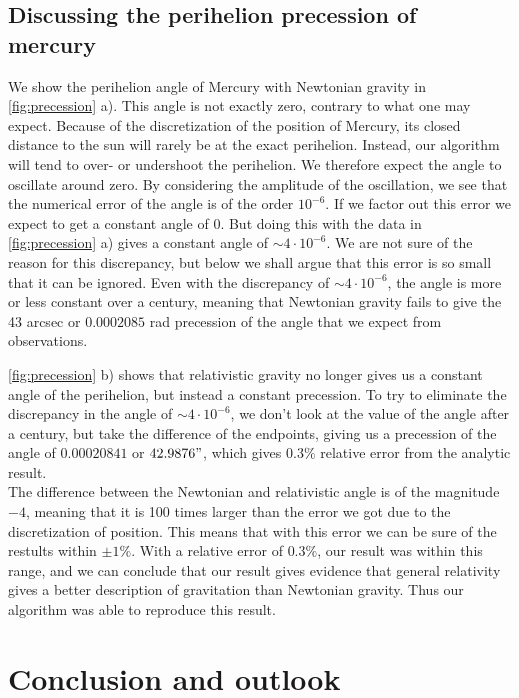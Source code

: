 \documentclass[a4paper, 10pt]{article}
\begin{document}
\subsection{Discussing the perihelion precession of mercury}
We show the perihelion angle of Mercury with Newtonian gravity in \cref{fig:precession} a). This angle is not exactly zero, contrary to what one may expect. Because of the discretization of the position of Mercury, its closed distance to the sun will rarely be at the exact perihelion. Instead, our algorithm will tend to over- or undershoot the perihelion. We therefore expect the angle to oscillate around zero. By considering the amplitude of the oscillation,  we see that the numerical error of the angle is of the order $10^{-6}$. If we factor out this error we expect to get a constant angle of 0. But doing this with the data in \cref{fig:precession} a) gives a constant angle of $\sim 4 \cdot 10^{-6}$. We are not sure of the reason for this discrepancy, but below we shall argue that this error is so small that it can be ignored. Even with the discrepancy of $\sim 4 \cdot 10^{-6}$, the angle is more or less constant over a century, meaning that Newtonian gravity fails to give the 43 arcsec or $0.0002085$ rad precession of the angle that we expect from observations. \linebreak

\cref{fig:precession} b) shows that relativistic gravity no longer gives us a constant angle of the perihelion, but instead a constant precession. To try to eliminate the discrepancy in the angle of $\sim 4 \cdot 10^{-6}$, we don't look at the value of the angle after a century, but take the difference of the endpoints, giving us a precession of the angle of $0.00020841$ or $42.9876"$, which gives $0.3\%$ relative error from the analytic result. \\

The difference between the Newtonian and relativistic angle is of the magnitude $-4$, meaning that it is 100 times larger than the error we got due to the discretization of position. This means that with this error we can be sure of the restults within $\pm 1\%$. With a relative error of $0.3 \%$, our result was within this range, and we can conclude that our result gives evidence that general relativity gives a better description of gravitation than Newtonian gravity. Thus our algorithm was able to reproduce this result.
\section{Conclusion and outlook}
\end{document}
